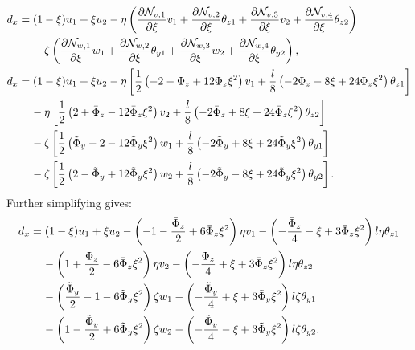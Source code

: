 \documentclass[a4paper,11pt]{article}
\begin{document}
\begin{align}
	d_x & = (1-\xi)u_1 + \xi u_2 - \eta \left( \frac{\partial \mathcal{N}_{v,1}}{\partial \xi} v_1 + \frac{\partial \mathcal{N}_{v,2}}{\partial \xi} \theta_{z1} + \frac{\partial \mathcal{N}_{v,3}}{\partial \xi} v_2 + \frac{\partial \mathcal{N}_{v,4}}{\partial \xi} \theta_{z2} \right) \nonumber \\
	& \text{\hspace{4mm}} - \zeta \left( \frac{\partial \mathcal{N}_{w,1}}{\partial \xi} w_1 + \frac{\partial \mathcal{N}_{w,2}}{\partial \xi} \theta_{y1} + \frac{\partial \mathcal{N}_{w,3}}{\partial \xi} w_2 + \frac{\partial \mathcal{N}_{w,4}}{\partial \xi} \theta_{y2} \right), \nonumber \\
	d_x & = (1-\xi)u_1 + \xi u_2 - \eta \left[ \frac{1}{2} \left( -2 - \bar{\Phi}_z + 12 \bar{\Phi}_z \xi^2 \right) v_1 + \frac{l}{8} \left( - 2 \bar{\Phi}_z - 8 \xi + 24 \bar{\Phi}_z \xi^2 \right) \theta_{z1} \right] \nonumber \\
	& \text{\hspace{4mm}} - \eta \left[ \frac{1}{2}\left( 2 + \bar{\Phi}_z - 12 \bar{\Phi}_z \xi^2 \right) v_2 + \frac{l}{8}\left( -2 \bar{\Phi}_z + 8 \xi + 24 \bar{\Phi}_z \xi^2 \right) \theta_{z2} \right] \nonumber \\
	& \text{\hspace{4mm}} - \zeta \left[ \frac{1}{2} \left( \tilde{\Phi}_y - 2 - 12 \tilde{\Phi}_y \xi^2 \right) w_1 + \frac{l}{8} \left( -2 \tilde{\Phi}_y + 8 \xi + 24 \tilde{\Phi}_y \xi^2 \right)\theta_{y1} \right] \nonumber \\
	& \text{\hspace{4mm}} - \zeta \left[ \frac{1}{2} \left( 2 - \tilde{\Phi}_y + 12 \tilde{\Phi}_y \xi^2 \right) w_2 + \frac{l}{8} \left( -2 \tilde{\Phi}_y - 8 \xi + 24 \tilde{\Phi}_y \xi^2 \right) \theta_{y2} \right]. \nonumber
\end{align}
Further simplifying gives:
\begin{align}
	d_x & = (1-\xi)u_1 + \xi u_2 - \left( -1 - \frac{\bar{\Phi}_z}{2} + 6 \bar{\Phi}_z \xi^2 \right) \eta v_1 - \left( - \frac{\bar{\Phi}_z}{4} - \xi + 3 \bar{\Phi}_z \xi^2 \right) l \eta \theta_{z1} \nonumber \\
	& \text{\hspace{4mm}} - \left( 1 + \frac{\bar{\Phi}_z}{2} - 6 \bar{\Phi}_z \xi^2 \right) \eta v_2 - \left( -\frac{\bar{\Phi}_z}{4} + \xi + 3 \bar{\Phi}_z \xi^2 \right) l \eta \theta_{z2} \nonumber \\
	& \text{\hspace{4mm}} - \left( \frac{\tilde{\Phi}_y}{2} - 1 - 6 \tilde{\Phi}_y \xi^2 \right) \zeta w_1 - \left( -\frac{\tilde{\Phi}_y}{4} + \xi + 3 \tilde{\Phi}_y \xi^2 \right) l \zeta \theta_{y1} \nonumber \\
	& \text{\hspace{4mm}} - \left( 1 - \frac{\tilde{\Phi}_y}{2} + 6 \tilde{\Phi}_y \xi^2 \right) \zeta w_2 - \left( -\frac{\tilde{\Phi}_y}{4} - \xi + 3 \tilde{\Phi}_y \xi^2 \right) l \zeta \theta_{y2}. \label{eq:d_x_expr}
\end{align}
\end{document}
